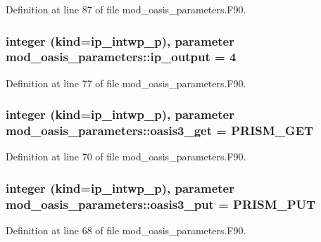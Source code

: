 Definition at line 87 of file mod\+\_\+oasis\+\_\+parameters.\+F90.

\hypertarget{classmod__oasis__parameters_a556f148d126d8d6dfe711656024436e6}{
\subsubsection[{ip\+\_\+output}]{\setlength{\rightskip}{0pt plus 5cm}integer (kind=ip\+\_\+intwp\+\_\+p), parameter mod\+\_\+oasis\+\_\+parameters\+::ip\+\_\+output = 4}}\label{classmod__oasis__parameters_a556f148d126d8d6dfe711656024436e6}


Definition at line 77 of file mod\+\_\+oasis\+\_\+parameters.\+F90.

\hypertarget{classmod__oasis__parameters_aa2ac99363b8f1aa7ff950fda3e3f5fff}{
\subsubsection[{oasis3\+\_\+get}]{\setlength{\rightskip}{0pt plus 5cm}integer (kind=ip\+\_\+intwp\+\_\+p), parameter mod\+\_\+oasis\+\_\+parameters\+::oasis3\+\_\+get = P\+R\+I\+S\+M\+\_\+\+G\+E\+T}}\label{classmod__oasis__parameters_aa2ac99363b8f1aa7ff950fda3e3f5fff}


Definition at line 70 of file mod\+\_\+oasis\+\_\+parameters.\+F90.

\hypertarget{classmod__oasis__parameters_a325334a5e2f9d0c7846c1ef964f9f7e3}{
\subsubsection[{oasis3\+\_\+put}]{\setlength{\rightskip}{0pt plus 5cm}integer (kind=ip\+\_\+intwp\+\_\+p), parameter mod\+\_\+oasis\+\_\+parameters\+::oasis3\+\_\+put = P\+R\+I\+S\+M\+\_\+\+P\+U\+T}}\label{classmod__oasis__parameters_a325334a5e2f9d0c7846c1ef964f9f7e3}


Definition at line 68 of file mod\+\_\+oasis\+\_\+parameters.\+F90.

